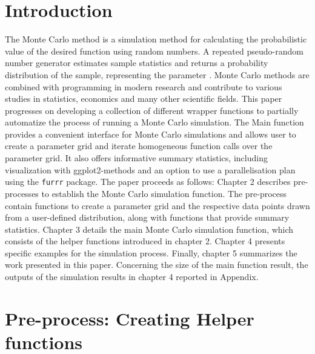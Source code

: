 \documentclass[11pt,a4paper]{article}
\begin{document}
\restoregeometry


{
\hypersetup{linkcolor=black}
\setcounter{tocdepth}{3}
\tableofcontents
}
\newpage
\listoftables
\newpage
\listoffigures
\newpage
{} 
\hypertarget{introduction}{%
\section{Introduction}\label{introduction}}

The Monte Carlo method is a simulation method for calculating the
probabilistic value of the desired function using random numbers. A
repeated pseudo-random number generator estimates sample statistics and
returns a probability distribution of the sample, representing the
parameter \autocite{Barbu_2020}. Monte Carlo methods are combined with
programming in modern research and contribute to various studies in
statistics, economics and many other scientific fields. This paper
progresses on developing a collection of different wrapper functions to
partially automatize the process of running a Monte Carlo simulation.
The Main function provides a convenient interface for Monte Carlo
simulations and allows user to create a parameter grid and iterate
homogeneous function calls over the parameter grid. It also offers
informative summary statistics, including visualization with
ggplot2-methods and an option to use a parallelisation plan using the
\texttt{furrr} package. The paper proceeds as follows: Chapter 2
describes pre-processes to establish the Monte Carlo simulation
function. The pre-process contain functions to create a parameter grid
and the respective data points drawn from a user-defined distribution,
along with functions that provide summary statistics. Chapter 3 details
the main Monte Carlo simulation function, which consists of the helper
functions introduced in chapter 2. Chapter 4 presents specific examples
for the simulation process. Finally, chapter 5 summarizes the work
presented in this paper. Concerning the size of the main function
result, the outputs of the simulation results in chapter 4 reported in
Appendix.

\hypertarget{pre-process-creating-helper-functions}{%
\section{Pre-process: Creating Helper
functions}\label{pre-process-creating-helper-functions}}
\end{document}
